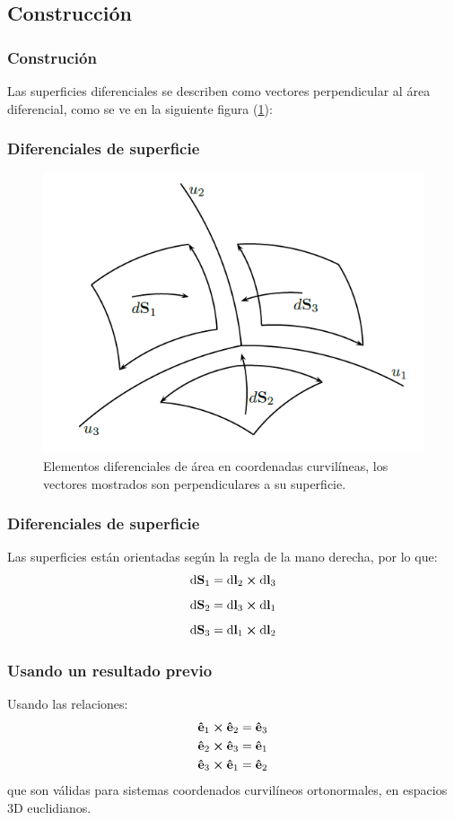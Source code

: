 \documentclass[12pt]{beamer}
\begin{document}
\subsection{Construcción}
\begin{frame}
\frametitle{Construción}
Las superficies diferenciales se describen como vectores perpendicular al área diferencial, como se ve en la siguiente figura (\ref{fig:figura_diferenciales_superficie}):
\end{frame}
\begin{frame}
\frametitle{Diferenciales de superficie}
\begin{figure}[h!]
    \centering
    \includegraphics[scale=0.5]{Imagenes/Diferenciales_Superficie_01.png}
    \caption{Elementos diferenciales de área en coordenadas curvilíneas, los vectores mostrados son perpendiculares a su superficie.}
    \label{fig:figura_diferenciales_superficie}
\end{figure}
\end{frame}
\begin{frame}
\frametitle{Diferenciales de superficie}
Las superficies están orientadas según la regla de la mano derecha, por lo que:
\begin{align*}
\dd{\vb{S}_{1}} &= \dd{\vb{l}_{2}} \cp \dd{\vb{l}_{3}} \\[0.5em] 
\dd{\vb{S}_{2}} &= \dd{\vb{l}_{3}} \cp \dd{\vb{l}_{1}} \\[0.5em]
\dd{\vb{S}_{3}} &= \dd{\vb{l}_{1}} \cp \dd{\vb{l}_{2}}
\end{align*}
\end{frame}
\begin{frame}
\frametitle{Usando un resultado previo}
Usando las relaciones:
\begin{align*}
\vu{e}_{1} \cp \vu{e}_{2} = \vu{e}_{3} \\
\vu{e}_{2} \cp \vu{e}_{3} = \vu{e}_{1} \\
\vu{e}_{3} \cp \vu{e}_{1} = \vu{e}_{2}
\end{align*}
que son válidas para sistemas coordenados curvilíneos ortonormales, en espacios 3D euclidianos.
\end{frame}
\end{document}
